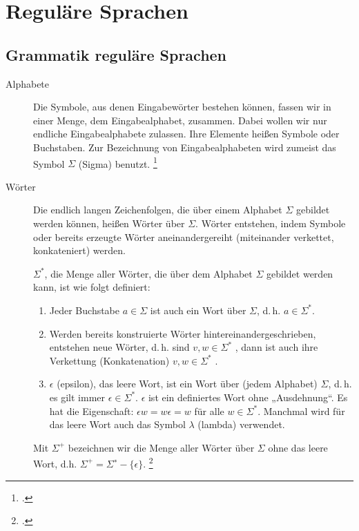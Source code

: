 \documentclass{lehramt-informatik-haupt}
\begin{document}

\chapter{Reguläre Sprachen}

%

\section{Grammatik reguläre Sprachen}

\begin{description}
\item[Alphabete]

Die Symbole, aus denen Eingabewörter bestehen können, fassen wir in
einer Menge, dem Eingabealphabet, zusammen. Dabei wollen wir nur
endliche Eingabealphabete zulassen. Ihre Elemente heißen Symbole oder
Buchstaben. Zur Bezeichnung von Eingabealphabeten wird zumeist das
Symbol $\Sigma$ (Sigma) benutzt.
\footcite[Seite 15]{vossen}

\item[Wörter]
Die endlich langen Zeichenfolgen, die über einem Alphabet $\Sigma$
gebildet werden können, heißen Wörter über $\Sigma$. Wörter entstehen,
indem Symbole oder bereits erzeugte Wörter aneinandergereiht
(miteinander verkettet, konkateniert) werden.

$\Sigma^*$, die Menge aller Wörter, die über dem Alphabet $\Sigma$
gebildet werden kann, ist wie folgt definiert:

\begin{enumerate}
\item Jeder Buchstabe $a \in \Sigma$ ist auch ein Wort über $\Sigma$,
d.\,h. $a \in \Sigma^*$.

\item Werden bereits konstruierte Wörter hintereinandergeschrieben,
entstehen neue Wörter, d.\,h. sind $v, w \in Σ^*$ , dann ist auch ihre
Verkettung (Konkatenation) $v, w \in Σ^*$ .

\item $\epsilon$ (epsilon), das leere Wort, ist ein Wort über (jedem
Alphabet) $\Sigma$, d.\,h. es gilt immer $\epsilon \in Σ^*$. $\epsilon$
ist ein definiertes Wort ohne „Ausdehnung“. Es hat die Eigenschaft:
$\epsilon w = w \epsilon = w$ für alle $w \in Σ^*$. Manchmal wird für
das leere Wort auch das Symbol $\lambda$ (lambda) verwendet.
\end{enumerate}

Mit $\Sigma^+$ bezeichnen wir die Menge aller Wörter über $\Sigma$ ohne
das leere Wort, d.h. $\Sigma^+ = \Sigma^∗ - \{ \epsilon \}$.
\footcite[Seite 16]{vossen}
\end{description}
\end{document}
